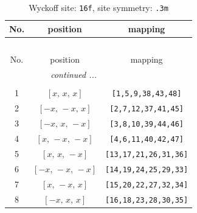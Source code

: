 \documentclass[fleqn,8pt]{jsarticle}
\begin{document}
\begin{longtable}{ccc}
\caption{Wyckoff site: {\tt 16f}, site symmetry: {\tt .3m}}
 \\
 \hline \hline
No. & position & mapping \\ \hline \endfirsthead

\multicolumn{2}{l}{\tablename\ \thetable{}} \\
 \hline \hline
No. & position & mapping \\ \hline \endhead

 \hline \hline
\multicolumn{2}{r}{\footnotesize\it continued ...} \\ \endfoot

 \hline \hline
\multicolumn{2}{r}{} \\ \endlastfoot

1 & $\left[ x,\, x,\, x \right]$ & {\tt [1,5,9,38,43,48]} \\ \hline
2 & $\left[ - x,\, - x,\, x \right]$ & {\tt [2,7,12,37,41,45]} \\ \hline
3 & $\left[ - x,\, x,\, - x \right]$ & {\tt [3,8,10,39,44,46]} \\ \hline
4 & $\left[ x,\, - x,\, - x \right]$ & {\tt [4,6,11,40,42,47]} \\ \hline
5 & $\left[ x,\, x,\, - x \right]$ & {\tt [13,17,21,26,31,36]} \\ \hline
6 & $\left[ - x,\, - x,\, - x \right]$ & {\tt [14,19,24,25,29,33]} \\ \hline
7 & $\left[ x,\, - x,\, x \right]$ & {\tt [15,20,22,27,32,34]} \\ \hline
8 & $\left[ - x,\, x,\, x \right]$ & {\tt [16,18,23,28,30,35]} \\
\end{longtable}
\renewcommand{\arraystretch}{1.2}
\end{document}
